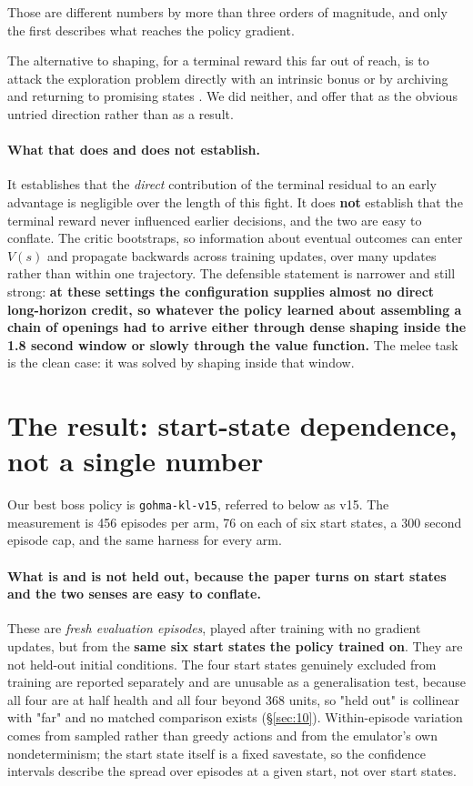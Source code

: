 \documentclass[11pt]{article}
\begin{document}
Those are different numbers by more than three orders of magnitude, and only the first describes what reaches the policy gradient.

The alternative to shaping, for a terminal reward this far out of reach, is to attack the exploration problem directly with an intrinsic bonus \cite{burda2019rnd} or by archiving and returning to promising states \cite{ecoffet2021goexplore}. We did neither, and offer that as the obvious untried direction rather than as a result.

\paragraph{What that does and does not establish.} It establishes that the \emph{direct} contribution of the terminal residual to an early advantage is negligible over the length of this fight. It does \textbf{not} establish that the terminal reward never influenced earlier decisions, and the two are easy to conflate. The critic bootstraps, so information about eventual outcomes can enter $V(s)$ and propagate backwards across training updates, over many updates rather than within one trajectory. The defensible statement is narrower and still strong: \textbf{at these settings the configuration supplies almost no direct long-horizon credit, so whatever the policy learned about assembling a chain of openings had to arrive either through dense shaping inside the 1.8 second window or slowly through the value function.} The melee task is the clean case: it was solved by shaping inside that window.


\section{The result: start-state dependence, not a single number}
\label{sec:5}

Our best boss policy is \texttt{gohma-kl-v15}, referred to below as v15. The measurement is 456 episodes per arm, 76 on each of six start states, a 300 second episode cap, and the same harness for every arm.

\paragraph{What is and is not held out, because the paper turns on start states and the two senses are easy to conflate.} These are \emph{fresh evaluation episodes}, played after training with no gradient updates, but from the \textbf{same six start states the policy trained on}. They are not held-out initial conditions. The four start states genuinely excluded from training are reported separately and are unusable as a generalisation test, because all four are at half health and all four beyond 368 units, so "held out" is collinear with "far" and no matched comparison exists (\S\ref{sec:10}). Within-episode variation comes from sampled rather than greedy actions and from the emulator's own nondeterminism; the start state itself is a fixed savestate, so the confidence intervals describe the spread over episodes at a given start, not over start states.
\end{document}

